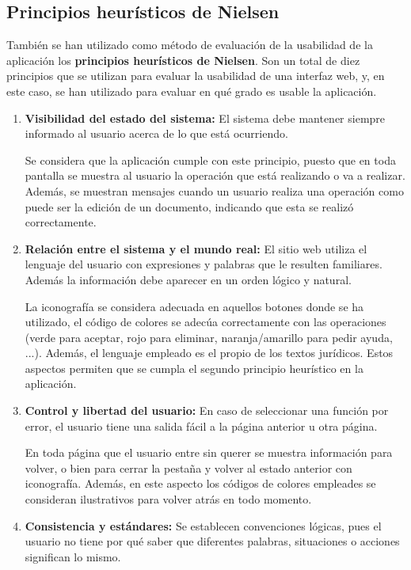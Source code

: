 \subsection{Principios heurísticos de Nielsen}

También se han utilizado como método de evaluación de la usabilidad de la aplicación los {\bf principios heurísticos de Nielsen}. Son un total de diez principios que se utilizan para evaluar la usabilidad de una interfaz web, y, en este caso, se han utilizado para evaluar en qué grado es usable la aplicación.

\begin{enumerate}
    \item {\bf Visibilidad del estado del sistema:} El sistema debe mantener siempre informado al usuario acerca de lo que está ocurriendo.
    
    Se considera que la aplicación cumple con este principio, puesto que en toda pantalla se muestra al usuario la operación que está realizando o va a realizar. Además, se muestran mensajes cuando un usuario realiza una operación como puede ser la edición de un documento, indicando que esta se realizó correctamente.
    
    
    \item {\bf Relación entre el sistema y el mundo real:} El sitio web utiliza el lenguaje del usuario con expresiones y palabras que le resulten familiares. Además la información debe aparecer en un orden lógico y natural.
    
    La iconografía se considera adecuada en aquellos botones donde se ha utilizado, el código de colores se adecúa correctamente con las operaciones (verde para aceptar, rojo para eliminar, naranja/amarillo para pedir ayuda, ...). Además, el lenguaje empleado es el propio de los textos jurídicos. Estos aspectos permiten que se cumpla el segundo principio heurístico en la aplicación.
    
    
    \item {\bf Control y libertad del usuario:} En caso de seleccionar una función por error, el usuario tiene una salida fácil a la página anterior u otra página.
    
    En toda página que el usuario entre sin querer se muestra información para volver, o bien para cerrar la pestaña y volver al estado anterior con iconografía. Además, en este aspecto los códigos de colores empleades se consideran ilustrativos para volver atrás en todo momento.
    
    
    \item {\bf Consistencia y estándares:} Se establecen convenciones lógicas, pues el usuario no tiene por qué saber que diferentes palabras, situaciones o acciones significan lo mismo.
    

\end{enumerate}
